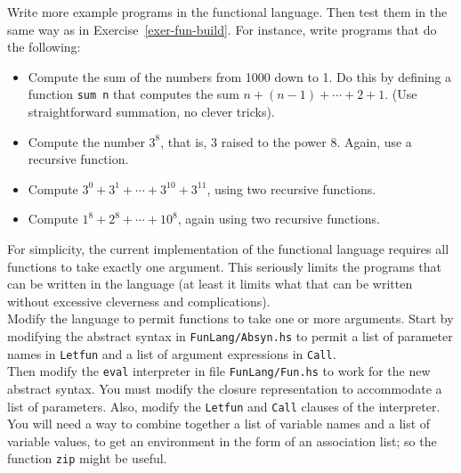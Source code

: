 \documentclass[a4paper]{article}
\begin{document}
\begin{exercise}\label{exer-fun-more-examples}
  Write more example programs in the functional language.  Then test
  them in the same way as in Exercise~\ref{exer-fun-build}\@.  For
  instance, write programs that do the following:

  \begin{itemize}
  \item Compute the sum of the numbers from 1000 down to 1.  Do this
    by defining a function \texttt{sum n} that computes the sum
    $n+(n-1)+\cdots + 2 + 1$.  (Use straightforward summation, no
    clever tricks).

  \item Compute the number $3^8$, that is, 3 raised to the power 8.
    Again, use a recursive function.

  \item Compute $3^0 + 3^1 + \cdots + 3^{10} + 3^{11}$, using two
    recursive functions.

  \item Compute $1^8 + 2^8 + \cdots + 10^8$, again using two recursive
    functions.
  \end{itemize}
\end{exercise}


\begin{exercise}\label{exer-fun-multiple-arguments}
  For simplicity, the current implementation of the functional
  language requires all functions to take exactly one argument.  This
  seriously limits the programs that can be written in the language
  (at least it limits what that can be written without excessive
  cleverness and complications).\\
  
  Modify the language to permit functions to take one or more
  arguments.  Start by modifying the abstract syntax in
  \texttt{FunLang/Absyn.hs} to permit a list of parameter names in
  \texttt{Letfun} and a list of argument expressions in
  \texttt{Call}\@.  \\
  

  
  Then modify the \texttt{eval} interpreter in file
  \texttt{FunLang/Fun.hs} to work for the new abstract syntax.  You must
  modify the closure representation to accommodate a list of
  parameters.  Also, modify the \texttt{Letfun} and \texttt{Call}
  clauses of the interpreter.  You will need a way to combine together a
  list of variable names and a list of variable values, to get an
  environment in the form of an association list; so the function
  \texttt{zip} might be useful.\\
  

  
\end{exercise}
\end{document}
